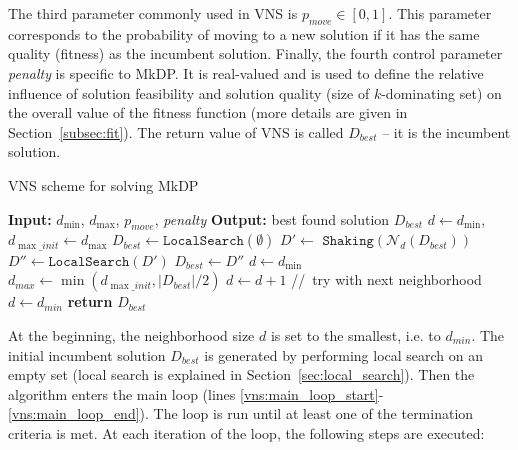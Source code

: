 \documentclass[dvipsnames,format=sigconf,anonymous=true,review=true]{acmart}
\begin{document}
 The third parameter commonly used in VNS is $p_{move} \in [0, 1]$. This parameter corresponds to the probability of moving to a new solution if it has the same quality (fitness) as the incumbent solution. 
 Finally, the fourth control parameter \emph{penalty} is specific to MkDP. It is real-valued and is used to define the relative influence of solution feasibility and solution quality (size of $k$-dominating set) on the overall value of the fitness function (more details are given in Section~\ref{subsec:fit}).
 The return value of VNS is called $D_{best}$ -- it is the incumbent solution. 
  
     \begin{algorithm}[!t] 
  	\caption{VNS scheme for solving MkDP}\label{alg:vns}
  	\begin{algorithmic}[1]
  		\STATE \textbf{Input:} $d_{\min}$, $d_{\max}$, $p_{move}$, \emph{penalty}
  		\STATE \textbf{Output:} best found solution $D_{best}$
  		\STATE $d \gets  d_{\min}$, $d_{\max\_init} \gets d_{\max}$
  		\STATE  $D_{best} \gets \texttt{LocalSearch}(\emptyset)$ \label{vns:init}
  		  \label{vns:main_loop_start}
  		\STATE  $D' \gets$  $\texttt{Shaking}(\mathcal{N}_d(D_{best}))$
  		\STATE $D'' \gets  \texttt{LocalSearch}(D')$
  		 \label{line:acceptance_incumbent_cond}
  	    \STATE $D _{best}\gets D''$
  	    \STATE $d \gets d_{\min}$
  	 	\STATE  $d_{max} \gets \min(d_{\max\_init}, |D_{best}|/2)$  \label{vns:implicit_bound}
  		\ELSE 
  		\STATE $d \gets d + 1$ \hspace{0.3cm}//\, try with next neighborhood
  		\STATE $d\gets d_{min}$
  		\ENDIF
  		\ENDIF
  		\ENDWHILE \label{vns:main_loop_end}
  		\STATE \textbf{return} $D_{best}$
  	\end{algorithmic}
  \end{algorithm}

  At the beginning, the neighborhood size $d$ is set to the smallest, i.e. to $d_{min}$. 
  The initial incumbent solution $D_{best}$ is generated by performing local search on an empty set (local search is explained in Section~\ref{sec:local_search}).  
  Then the algorithm enters the main loop (lines \ref{vns:main_loop_start}-\ref{vns:main_loop_end}). The loop is run until at least one of the termination criteria is met. At each iteration of the loop, the following steps are executed: 
  
\end{document}
